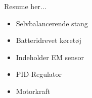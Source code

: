 Resume her... 
\begin{itemize}
	\item Selvbalancerende stang
	\item Batteridrevet køretøj
	\item Indeholder EM sensor
	\item PID-Regulator
	\item Motorkraft	
\end{itemize}

